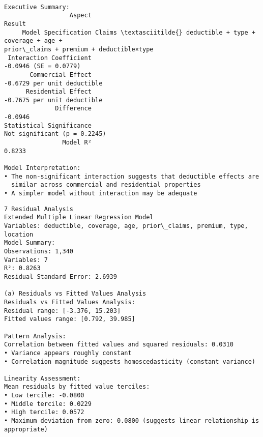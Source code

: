 \documentclass[8pt, twocolumn]{extarticle}
\begin{document}
    \begin{center}
    \end{center}
    { \hspace*{\fill} \\}
    \begin{Verbatim}[commandchars=\\\{\}]
Executive Summary:
                  Aspect
Result
     Model Specification Claims \textasciitilde{} deductible + type + coverage + age +
prior\_claims + premium + deductible×type
 Interaction Coefficient
-0.0946 (SE = 0.0779)
       Commercial Effect
-0.6729 per unit deductible
      Residential Effect
-0.7675 per unit deductible
              Difference
-0.0946
Statistical Significance
Not significant (p = 0.2245)
                Model R²
0.8233

Model Interpretation:
• The non-significant interaction suggests that deductible effects are
  similar across commercial and residential properties
• A simpler model without interaction may be adequate
    \end{Verbatim}
    \begin{Verbatim}[commandchars=\\\{\}]
7 Residual Analysis
Extended Multiple Linear Regression Model
Variables: deductible, coverage, age, prior\_claims, premium, type, location
Model Summary:
Observations: 1,340
Variables: 7
R²: 0.8263
Residual Standard Error: 2.6939

(a) Residuals vs Fitted Values Analysis
Residuals vs Fitted Values Analysis:
Residual range: [-3.376, 15.203]
Fitted values range: [0.792, 39.985]

Pattern Analysis:
Correlation between fitted values and squared residuals: 0.0310
• Variance appears roughly constant
• Correlation magnitude suggests homoscedasticity (constant variance)

Linearity Assessment:
Mean residuals by fitted value terciles:
• Low tercile: -0.0800
• Middle tercile: 0.0229
• High tercile: 0.0572
• Maximum deviation from zero: 0.0800 (suggests linear relationship is
appropriate)
    \end{Verbatim}
    \begin{center}
    \end{center}
    { \hspace*{\fill} \\}
\end{document}

